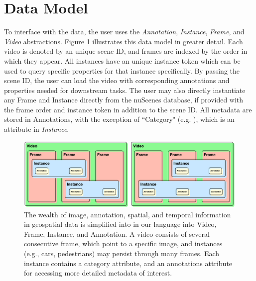 
\section{Data Model}

To interface with the data, the user uses the \textit{Annotation}, \textit{Instance}, \textit{Frame}, and \textit{Video} abstractions.
Figure \ref{fig:abstraction} illustrates this data model in greater detail.
Each video is denoted by an unique scene ID, and frames are indexed by the order in which they appear.
All instances have an unique instance token which can be used to query specific properties for that instance specifically.
By passing the scene ID, the user can load the video with corresponding annotations and properties needed for downstream tasks.
The user may also directly instantiate any Frame and Instance directly from the nuScenes database, if provided with the frame order and instance token in addition to the scene ID.
All metadata are stored in Annotations, with the exception of ``Category" (e.g. ), which is an attribute in \textit{Instance}.

\newcommand{\dataModelCaption}{
The wealth of image, annotation, spatial, and temporal information in geospatial data is simplified into in our language into Video, Frame, Instance, and Annotation.
A video consists of several consecutive frame, which point to a specific image, and instances (e.g., cars, pedestrians) may persist through many frames.
Each instance contains a category attribute, and an annotations attribute for accessing more detailed metadata of interest.
}

\begin{figure}[ht]
    \centering
    \includegraphics[width=\textwidth]{figures/data-abstraction.png}
    \caption{\dataModelCaption}
    \label{fig:abstraction}
\end{figure}

\newcommand{\dataHierarchyCaption}{
The hierarchy of our data type.
Users can start exploring they geospatial-video data from \emph{Video}.
Then, 
}

